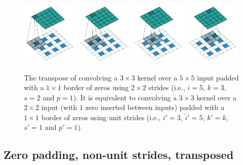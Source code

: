 \begin{figure}[p]
    \centering
    \includegraphics[width=0.24\textwidth]{pdf/padding_strides_transposed_00.pdf}
    \includegraphics[width=0.24\textwidth]{pdf/padding_strides_transposed_01.pdf}
    \includegraphics[width=0.24\textwidth]{pdf/padding_strides_transposed_02.pdf}
    \includegraphics[width=0.24\textwidth]{pdf/padding_strides_transposed_03.pdf}
    \caption{\label{fig:padding_strides_transposed} The transpose of convolving
        a $3 \times 3$ kernel over a $5 \times 5$ input padded with a $1 \times
        1$ border of zeros using $2 \times 2$ strides (i.e., $i = 5$, $k = 3$, $s
        = 2$ and $p = 1$). It is equivalent to convolving a $3 \times 3$ kernel
        over a $2 \times 2$ input (with $1$ zero inserted between inputs) padded
        with a $1 \times 1$ border of zeros using unit strides (i.e., $i' = 3$,
        $\tilde{i}' = 5$, $k' = k$, $s' = 1$ and $p' = 1$).}
\end{figure}

\subsection{Zero padding, non-unit strides, transposed}

